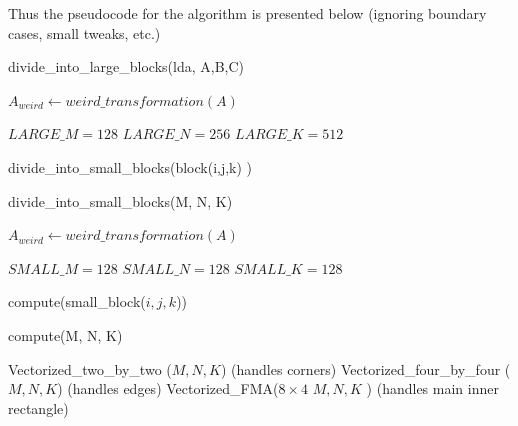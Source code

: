 \documentclass[12pt]{article}
\begin{document}
Thus the pseudocode for the algorithm is presented below (ignoring boundary cases, small tweaks, etc.) 

\begin{algorithm}
\caption{divide\_into\_large\_blocks(lda, A,B,C)}
\begin{algorithmic} 
\STATE $A_{weird} \leftarrow weird\_transformation(A)$

\STATE $LARGE\_M = 128$
\STATE $LARGE\_N = 256$
\STATE $LARGE\_K = 512$




\STATE divide\_into\_small\_blocks(block(i,j,k) )

\ENDFOR
\ENDFOR
\ENDFOR
\end{algorithmic}
\end{algorithm}

\begin{algorithm}
\caption{divide\_into\_small\_blocks(M, N, K)}
\begin{algorithmic} 
\STATE $A_{weird} \leftarrow weird\_transformation(A)$

\STATE $SMALL\_M = 128$
\STATE $SMALL\_N = 128$
\STATE $SMALL\_K = 128$


\STATE compute(small\_block($i,j,k$))

\ENDFOR
\ENDFOR
\ENDFOR
\end{algorithmic}
\end{algorithm}

\begin{algorithm}
\caption{compute(M, N, K)}
\begin{algorithmic} 


\STATE Vectorized\_two\_by\_two ($M,N,K$) (handles corners)
\STATE Vectorized\_four\_by\_four ($M,N,K$) (handles edges)
\STATE Vectorized\_FMA($8 \times 4$ $M,N,K$ ) (handles main inner rectangle)

\end{algorithmic}
\end{algorithm}

\newpage 
\end{document}
